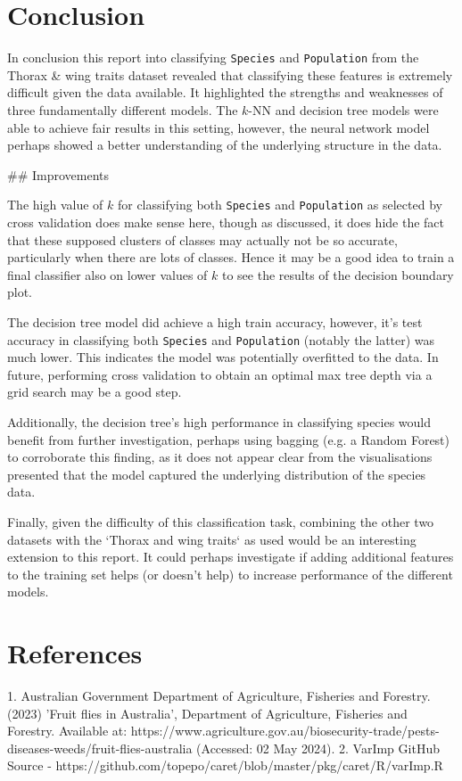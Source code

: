 \documentclass{article}
\begin{document}
\section{Conclusion}


In conclusion this report into classifying \texttt{Species} and \texttt{Population} from the Thorax & wing traits dataset revealed that classifying these features is extremely difficult given the data available. It highlighted the strengths and weaknesses of three fundamentally different models. The $k$-NN and decision tree models were able to achieve fair results in this setting, however, the neural network model perhaps showed a better understanding of the underlying structure in the data.

## Improvements

The high value of $k$ for classifying both \texttt{Species} and \texttt{Population} as selected by cross validation does make sense here, though as discussed, it does hide the fact that these supposed clusters of classes may actually not be so accurate, particularly when there are lots of classes. Hence it may be a good idea to train a final classifier also on lower values of $k$ to see the results of the decision boundary plot.

The decision tree model did achieve a high train accuracy, however, it's test accuracy in classifying both \texttt{Species} and \texttt{Population} (notably the latter) was much lower. This indicates the model was potentially overfitted to the data. In future, performing cross validation to obtain an optimal max tree depth via a grid search may be a good step.

Additionally, the decision tree's high performance in classifying species would benefit from further investigation, perhaps using bagging (e.g. a Random Forest) to corroborate this finding, as it does not appear clear from the visualisations presented that the model captured the underlying distribution of the species data.

Finally, given the difficulty of this classification task, combining the other two datasets with the `Thorax and wing traits` as used would be an interesting extension to this report. It could perhaps investigate if adding additional features to the training set helps (or doesn't help) to increase performance of the different models.


\section{References}

1. Australian Government Department of Agriculture, Fisheries and Forestry. (2023) 'Fruit flies in Australia', Department of Agriculture, Fisheries and Forestry. Available at: https://www.agriculture.gov.au/biosecurity-trade/pests-diseases-weeds/fruit-flies-australia (Accessed: 02 May 2024).
2. VarImp GitHub Source - https://github.com/topepo/caret/blob/master/pkg/caret/R/varImp.R
\end{document}
